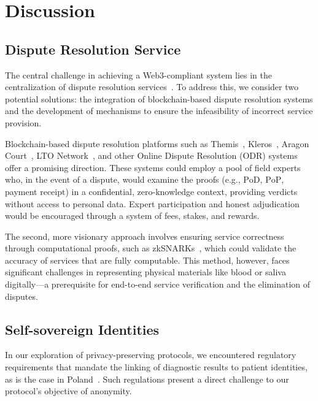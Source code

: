 \documentclass[pdftex,twocolumn,epjc3]{svjour3}
\begin{document}
\section{Discussion}
\label{sec:discussion}

\subsection{Dispute Resolution Service}\label{sec:decentralised-justice}

\begin{sloppypar}
The central challenge in achieving a Web3-compliant system lies in the centralization of dispute resolution services~\cite{ethereumWhatWeb3Why2023}. To address this, we consider two potential solutions: the integration of blockchain-based dispute resolution systems and the development of mechanisms to ensure the infeasibility of incorrect service provision.
\end{sloppypar}

Blockchain-based dispute resolution platforms such as Themis~\cite{mengThemisDecentralizedEscrow2019}, Kleros~\cite{bergollaKlerosSociolegalCase2022, gudkovCrowdArbitrationBlockchain2020}, Aragon Court~\cite{aragonDecentralizedDisputeResolution}, LTO Network~\cite{ltonetworkNextGenBlockchainB2B}, and other Online Dispute Resolution (ODR) systems~\cite{allenGovernanceBlockchainDispute2019} offer a promising direction. These systems could employ a pool of field experts who, in the event of a dispute, would examine the proofs (e.g., $\mathrm{PoD}$, $\mathrm{PoP}$, payment $\mathrm{receipt}$) in a confidential, zero-knowledge context, providing verdicts without access to personal data. Expert participation and honest adjudication would be encouraged through a system of fees, stakes, and rewards.

The second, more visionary approach involves ensuring service correctness through computational proofs, such as zkSNARKs~\cite{ben-sassonSNARKsVerifyingProgram2013}, which could validate the accuracy of services that are fully computable. This method, however, faces significant challenges in representing physical materials like blood or saliva digitally—a prerequisite for end-to-end service verification and the elimination of disputes.

\subsection{Self-sovereign Identities}
In our exploration of privacy-preserving protocols, we encountered regulatory requirements that mandate the linking of diagnostic results to patient identities, as is the case in Poland~\cite{ministerstwozdrowiaRegulationMinisterHealth2006}. Such regulations present a direct challenge to our protocol's objective of anonymity.
\end{document}
